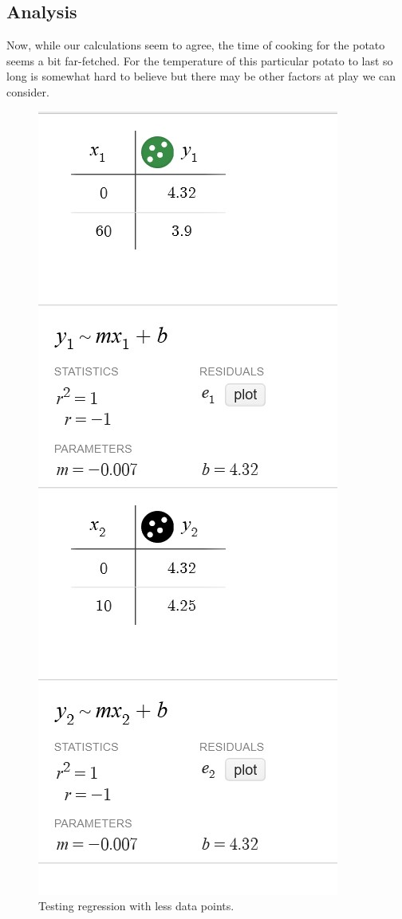 \documentclass{article}
\begin{document}
\newpage
\subsection{Analysis}
Now, while our calculations seem to agree, the time of cooking for the potato seems a bit far-fetched. For the temperature of this particular potato to last so long is somewhat hard to believe but there may be other factors at play we can consider.\\

\begin{figure}
    \centering
    \includegraphics[height=.5\textheight]{extra.jpg}
    \caption{Testing regression with less data points.}
\end{figure}
\end{document}
